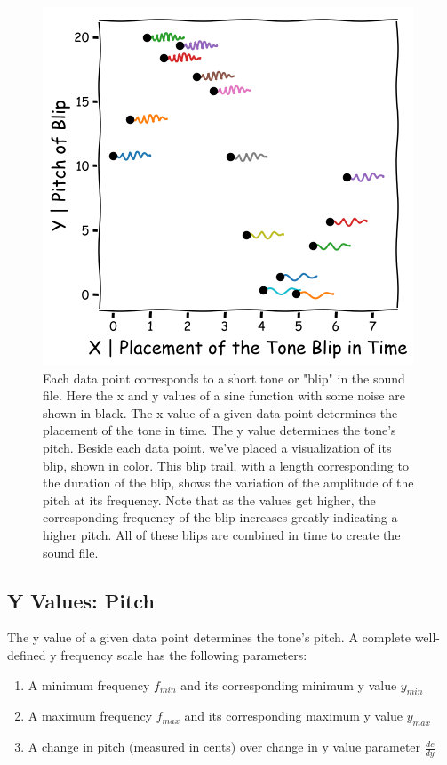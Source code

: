 \documentclass[]{acmsiggraph}
\begin{document}
\begin{figure}
\centering
\includegraphics[width=.7\linewidth]{paper/images/Method1.png}
\caption{Each data point corresponds to a short tone or "blip" in the sound file. Here the x and y values of a sine function with some noise are shown in black. The x value of a given data point determines the placement of the tone in time. The y value determines the tone’s pitch. Beside each data point, we've placed a visualization of its blip, shown in color. This blip trail, with a length corresponding to the duration of the blip, shows the variation of the amplitude of the pitch at its frequency. Note that as the values get higher, the corresponding frequency of the blip increases greatly indicating a higher pitch. All of these blips are combined in time to create the sound file.}
\label{fig:method} 
\end{figure}

\subsection{Y Values: Pitch}

The y value of a given data point determines the tone’s pitch. A complete well-defined y frequency scale has the following parameters:

\begin{enumerate}
\item A minimum frequency $f_{min}$ and its corresponding minimum y value $y_{min}$
\item A maximum frequency $f_{max}$ and its corresponding maximum y value $y_{max}$
\item A change in pitch (measured in cents) over change in y value parameter $\frac{dc}{dy}$
\end{enumerate}
\end{document}
